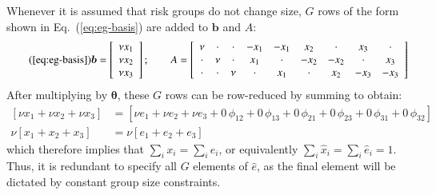 Whenever it is assumed that risk groups do not change size,
$G$ rows of the form shown in Eq.~(\ref{eq:eg-basis})
are added to $\bm{b}$ and $A$:
\begin{equation}\tag{\ref{eq:eg-basis}}
\bm{b} = \left[\begin{array}{c}
\nu x_1 \\ \nu x_2 \\ \nu x_3
\end{array}\right];\qquad
A = \left[\begin{array}{ccccccccc}
 \nu  & \cdot & \cdot & -x_1  & -x_1  &  x_2  & \cdot &  x_3  & \cdot \\
\cdot &  \nu  & \cdot &  x_1  & \cdot & -x_2  & -x_2  & \cdot &  x_3  \\
\cdot & \cdot &  \nu  & \cdot &  x_1  & \cdot &  x_2  & -x_3  & -x_3  \\
\end{array}\right]
\end{equation}
After multiplying by $\bm{\theta}$, these $G$ rows can be row-reduced by summing to obtain:
\begin{equation}
\begin{aligned}
\left[ \nu x_1 + \nu x_2 + \nu x_3 \right] &= 
\left[ \nu e_1 + \nu e_2 + \nu e_3
+ 0\,\phi_{12} + 0\,\phi_{13} + 0\,\phi_{21} + 0\,\phi_{23} + 0\,\phi_{31} + 0\,\phi_{32}
\right]\\
\nu \left[ x_1 + x_2 + x_3 \right] &= 
\nu \left[ e_1 + e_2 + e_3 \right]
\end{aligned}
\end{equation}
which therefore implies that $\sum_{i} x_i = \sum_{i} e_i$,
or equivalently $\sum_{i} \hat{x}_i = \sum_{i} \hat{e}_i = 1$.
Thus, it is redundant to specify all $G$ elements of $\hat{e}$,
as the final element will be dictated by constant group size constraints.